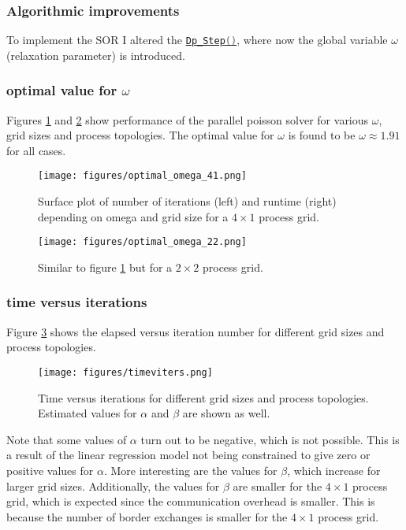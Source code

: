 \subsubsection{Algorithmic improvements}
To implement the SOR I altered the 
\href{https://github.com/PhilipSoliman/hpc-labs/blob/b16da8d7ee717657e13c316369fa0996da7816cc/assignment_1/ppoisson2.c#L576-L590}{\lstinline[language=C]|Dp_Step()|},
where now the global variable $\omega$ (relaxation parameter) is introduced.

\subsubsection{optimal value for $\omega$}
Figures \ref{fig:optimal_omega_22} and \ref{fig:optimal_omega_41} show performance of the parallel poisson solver for 
various $\omega$, grid sizes and process topologies. 
The optimal value for $\omega$ is found to be $\omega\approx1.91$ for all cases.
\begin{figure}[H]
    \centering
    \texttt{[image: figures/optimal\_omega\_41.png]}
    \caption{Surface plot of number of iterations (left) and runtime (right) depending on omega and grid size for a $4\times1$ process grid.}
    \label{fig:optimal_omega_22}
\end{figure}

\begin{figure}[H]
    \centering
    \texttt{[image: figures/optimal\_omega\_22.png]}
    \caption{Similar to figure \ref{fig:optimal_omega_22} but for a $2\times2$ process grid.}
    \label{fig:optimal_omega_41}
\end{figure}

\subsubsection{time versus iterations}
Figure \ref{fig:timeviters} shows the elapsed versus iteration number for different grid sizes and process topologies.
\begin{figure}[H]
    \centering
    \texttt{[image: figures/timeviters.png]}
    \caption{Time versus iterations for different grid sizes and process topologies. 
    Estimated values for $\alpha$ and $\beta$ are shown as well.}
    \label{fig:timeviters}
\end{figure}
Note that some values of $\alpha$ turn out to be negative, which is not possible.
This is a result of the linear regression model not being constrained to give zero or positive values for $\alpha$.
More interesting are the values for $\beta$, which increase for larger grid sizes. Additionally, the
values for $\beta$ are smaller for the $4\times1$ process grid, which is expected since the communication overhead is smaller.
This is because the number of border exchanges is smaller for the $4\times1$ process grid.

